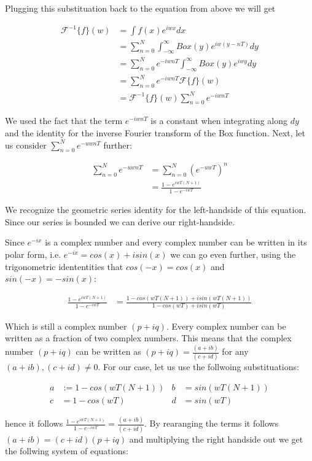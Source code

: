 Plugging this substituation back to the equation from above we will get 

\begin{align*}
\mathcal{F}^{-1}\{f\}(w)
& =\int f(x) e^{iwx}dx\\
& =\sum_{n=0}^{N} \int_{-\infty}^{\infty} Box(y) e^{iw(y-nT)}dy \\
& =\sum_{n=0}^{N} e^{-iwnT} \int_{-\infty}^{\infty} Box(y) e^{iwy}dy \\
& =\sum_{n=0}^{N} e^{-iwnT} \mathcal{F}\{f\}(w) \\
& =\mathcal{F}^{-1}\{f\}(w) \sum_{n=0}^{N} e^{-iwnT}  
\end{align*}

We used the fact that the term $e^{-iwnT}$ is a constant when integrating along $dy$ and the identity for the inverse Fourier transform of the Box function. Next, let us consider $\sum_{n=0}^N e^{-uwnT}$ further:

\begin{align*}
\sum_{n=0}^N e^{-uwnT}
& =\sum_{n=0}^N (e^{-uwT})^n \\
& =\frac{1-e^{iwT(N+1)}}{1-e^{-iwT}}
\end{align*}

We recognize the geometric series identity for the left-handside of this equation. Since our series is bounded we can derive our right-handside.

Since $e^{-ix}$ is a complex number and every complex number can be written in its polar form, i.e. $e^{-ix} = cos(x) + i sin(x)$ we can go even further, using the trigonometric idententities that $cos(-x) = cos(x)$ and $sin(-x) = -sin(x)$:

\begin{align*}
\frac{1-e^{iwT(N+1)}}{1-e^{-iwT}}
& =\frac{1-cos(wT(N+1)) + i sin(wT(N+1)) }{1-cos(wT) + i sin(wT)}
\end{align*}

Which is still a complex number $(p+iq)$. Every complex number can be written as a fraction of two complex numbers. This means that the complex number $(p+iq)$ can be written as $(p+iq) = \frac{(a+ib)}{(c+id)}$ for any $(a+ib), (c+id) \neq 0$. 
For our case, let us use the follwoing substituations: 

\begin{align}
a& := 1 - cos(wT(N+1))&
b& =sin(wT(N+1))\\
c& =1-cos(wT)&
d& =sin(wT)
\end{align}

hence it follows $\frac{1-e^{iwT(N+1)}}{1-e^{-iwT}} = \frac{(a+ib)}{(c+id)}$.
By rearanging the terms it follows $(a+ib) = (c+id)(p+iq)$ and multiplying the right handside out we get the follwing system of equations:

